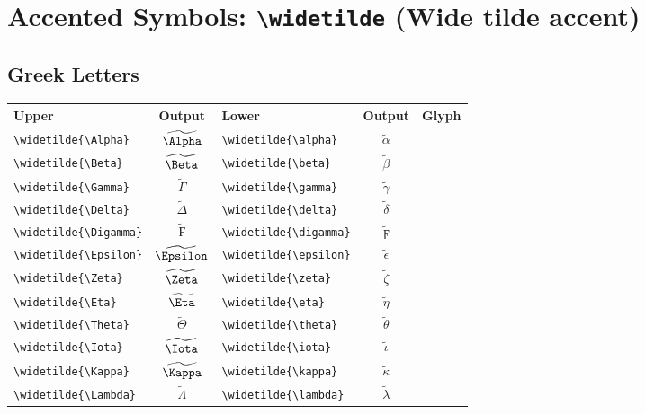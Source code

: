 \documentclass[12pt,a4paper]{article}
\begin{document}
\section*{Accented Symbols: \texttt{\textbackslash widetilde} (Wide tilde accent)}

\subsection*{Greek Letters}
\begin{longtable}{|l|c|l|c|c|}
\hline
\textbf{Upper}                 & \textbf{Output}        & \textbf{Lower}                 & \textbf{Output}           & \textbf{Glyph} \\
\hline
\verb|\widetilde{\Alpha}|      & $\widetilde{\Alpha}$   & \verb|\widetilde{\alpha}|      & $\widetilde{\alpha}$      & \\
\verb|\widetilde{\Beta}|       & $\widetilde{\Beta}$    & \verb|\widetilde{\beta}|       & $\widetilde{\beta}$       & \\
\verb|\widetilde{\Gamma}|      & $\widetilde{\Gamma}$   & \verb|\widetilde{\gamma}|      & $\widetilde{\gamma}$      & \\
\verb|\widetilde{\Delta}|      & $\widetilde{\Delta}$   & \verb|\widetilde{\delta}|      & $\widetilde{\delta}$      & \\
\verb|\widetilde{\Digamma}|    & $\widetilde{\Digamma}$ & \verb|\widetilde{\digamma}|    & $\widetilde{\digamma}$    & \\
\verb|\widetilde{\Epsilon}|    & $\widetilde{\Epsilon}$ & \verb|\widetilde{\epsilon}|    & $\widetilde{\epsilon}$    & \\
\verb|\widetilde{\Zeta}|       & $\widetilde{\Zeta}$    & \verb|\widetilde{\zeta}|       & $\widetilde{\zeta}$       & \\
\verb|\widetilde{\Eta}|        & $\widetilde{\Eta}$     & \verb|\widetilde{\eta}|        & $\widetilde{\eta}$        & \\
\verb|\widetilde{\Theta}|      & $\widetilde{\Theta}$   & \verb|\widetilde{\theta}|      & $\widetilde{\theta}$      & \\
\verb|\widetilde{\Iota}|       & $\widetilde{\Iota}$    & \verb|\widetilde{\iota}|       & $\widetilde{\iota}$       & \\
\verb|\widetilde{\Kappa}|      & $\widetilde{\Kappa}$   & \verb|\widetilde{\kappa}|      & $\widetilde{\kappa}$      & \\
\verb|\widetilde{\Lambda}|     & $\widetilde{\Lambda}$  & \verb|\widetilde{\lambda}|     & $\widetilde{\lambda}$     & \\

\end{longtable}
\end{document}
